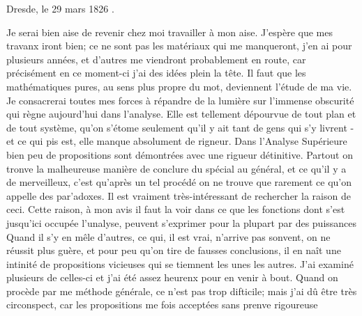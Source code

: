 \documentclass{article}
\begin{document}
Dresde, le 29 mars 1826 .

Je serai bien aise de revenir chez moi travailler à mon aise. J'espère que mes travanx iront bien; ce ne sont pas les matériaux qui me manqueront, j'en ai pour plusieurs années, et d'autres me viendront probablement en route, car précisément en ce moment-ci j'ai des idées plein la tête. Il faut que les mathématiques pures, au sens plus propre du mot, deviennent l'étude de ma vie. Je consacrerai toutes mes forces à répandre de la lumière sur l'immense obscurité qui règne aujourd'hui dans l'analyse. Elle est tellement dépourvue de tout plan et de tout système, qu'on s'étome seulement qu'il y ait tant de gens qui s'y livrent - et ce qui pis est, elle manque absolument de rigneur. Dans l'Analyse Supérieure bien peu de propositions sont démontrées avec une rigueur détinitive. Partout on tronve la malheureuse manière de conclure du spécial au général, et ce qu'il \(\mathrm{y}\) a de merveilleux, c'est qu'après un tel procédé on ne trouve que rarement ce qu'on appelle des par'adoxes. Il est vraiment très-intéressant de rechercher la raison de ceci. Cette raison, à mon avis il faut la voir dans ce que les fonctions dont s'est jusqu'ici occupée l'unalyse, peuvent s'exprimer pour la plupart par des puissances Quand il s'y en mêle d'autres, ce qui, il est vrai, n'arrive pas sonvent, on ne réussit plus guère, et pour peu qu'on tire de fausses conclusions, il en naît une intinité de propositions vicieuses qui se tiemnent les unes les autres. J'ai examiné plusieurs de celles-ci et j'ai été assez heurenx pour en venir à bout. Quand on procède par me méthode générale, ce n'est pas trop difticile; mais j'ai dû être très circonspect, car les propositions me fois acceptées sans prenve rigoureuse
\end{document}
